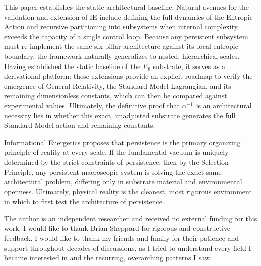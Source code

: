 This paper establishes the static architectural baseline. Natural avenues for the validation and extension of IE include defining the full dynamics of the Entropic Action and recursive partitioning into subsystems when internal complexity exceeds the capacity of a single control loop. Because any persistent subsystem must re-implement the same six-pillar architecture against its local entropic boundary, the framework naturally generalizes to nested, hierarchical scales. Having established the static baseline of the $E_8$ substrate, it serves as a derivational platform: these extensions provide an explicit roadmap to verify the emergence of General Relativity, the Standard Model Lagrangian, and its remaining dimensionless constants, which can then be compared against experimental values. Ultimately, the definitive proof that $\alpha^{-1}$ is an architectural necessity lies in whether this exact, unadjusted substrate generates the full Standard Model action and remaining constants.

Informational Energetics proposes that persistence is the primary organizing principle of reality at every scale. If the fundamental vacuum is uniquely determined by the strict constraints of persistence, then by the Selection Principle, any persistent macroscopic system is solving the exact same architectural problem, differing only in substrate material and environmental openness. Ultimately, physical reality is the cleanest, most rigorous environment in which to first test the architecture of persistence.

\begin{acknowledgments}
The author is an independent researcher and received no external funding for this work. I would like to thank Brian Sheppard for rigorous and constructive feedback. I would like to thank my friends and family for their patience and support throughout decades of discussions, as I tried to understand every field I became interested in and the recurring, overarching patterns I saw.
\end{acknowledgments}